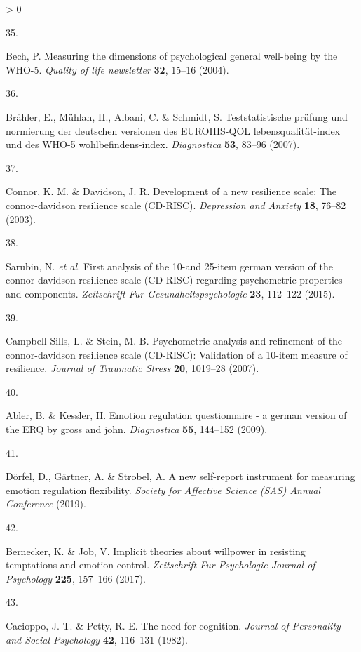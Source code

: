 \documentclass[
  english,
  man,floatsintext]{apa6}
\newlength{\cslhangindent}
\newlength{\csllabelwidth}
\newenvironment{CSLReferences}[2] %
 {%
  \setlength{\parindent}{0pt}
  \ifodd #1 \everypar{\setlength{\hangindent}{\cslhangindent}}\ignorespaces\fi
  \ifnum #2 > 0
  \setlength{\parskip}{#2\baselineskip}
  \fi
 }%
 {}
\newcommand{\CSLLeftMargin}[1]{\parbox[t]{\csllabelwidth}{#1}}
\newcommand{\CSLRightInline}[1]{\parbox[t]{\linewidth - \csllabelwidth}{#1}\break}
\begin{document}
\begin{CSLReferences}{0}{0}
\leavevmode\hypertarget{ref-Bech2004}{}%
\CSLLeftMargin{35. }
\CSLRightInline{Bech, P. Measuring the dimensions of psychological general well-being by the WHO-5. \emph{Quality of life newsletter} \textbf{32}, 15--16 (2004).}

\leavevmode\hypertarget{ref-Braehler2007}{}%
\CSLLeftMargin{36. }
\CSLRightInline{Brähler, E., Mühlan, H., Albani, C. \& Schmidt, S. Teststatistische pr{ü}fung und normierung der deutschen versionen des EUROHIS-QOL lebensqualit{ä}t-index und des WHO-5 wohlbefindens-index. \emph{Diagnostica} \textbf{53}, 83--96 (2007).}

\leavevmode\hypertarget{ref-Connor2003}{}%
\CSLLeftMargin{37. }
\CSLRightInline{Connor, K. M. \& Davidson, J. R. Development of a new resilience scale: The connor-davidson resilience scale (CD-RISC). \emph{Depression and Anxiety} \textbf{18}, 76--82 (2003).}

\leavevmode\hypertarget{ref-Sarubin2015}{}%
\CSLLeftMargin{38. }
\CSLRightInline{Sarubin, N. \emph{et al.} First analysis of the 10-and 25-item german version of the connor-davidson resilience scale (CD-RISC) regarding psychometric properties and components. \emph{Zeitschrift Fur Gesundheitspsychologie} \textbf{23}, 112--122 (2015).}

\leavevmode\hypertarget{ref-Campbell-Sills2007}{}%
\CSLLeftMargin{39. }
\CSLRightInline{Campbell-Sills, L. \& Stein, M. B. Psychometric analysis and refinement of the connor-davidson resilience scale (CD-RISC): Validation of a 10-item measure of resilience. \emph{Journal of Traumatic Stress} \textbf{20}, 1019--28 (2007).}

\leavevmode\hypertarget{ref-Abler2009}{}%
\CSLLeftMargin{40. }
\CSLRightInline{Abler, B. \& Kessler, H. Emotion regulation questionnaire - a german version of the ERQ by gross and john. \emph{Diagnostica} \textbf{55}, 144--152 (2009).}

\leavevmode\hypertarget{ref-Doerfel2019}{}%
\CSLLeftMargin{41. }
\CSLRightInline{Dörfel, D., Gärtner, A. \& Strobel, A. A new self-report instrument for measuring emotion regulation flexibility. \emph{Society for Affective Science (SAS) Annual Conference} (2019).}

\leavevmode\hypertarget{ref-Bernecker2017}{}%
\CSLLeftMargin{42. }
\CSLRightInline{Bernecker, K. \& Job, V. Implicit theories about willpower in resisting temptations and emotion control. \emph{Zeitschrift Fur Psychologie-Journal of Psychology} \textbf{225}, 157--166 (2017).}

\leavevmode\hypertarget{ref-Cacioppo1982}{}%
\CSLLeftMargin{43. }
\CSLRightInline{Cacioppo, J. T. \& Petty, R. E. The need for cognition. \emph{Journal of Personality and Social Psychology} \textbf{42}, 116--131 (1982).}


\end{CSLReferences}
\end{document}
